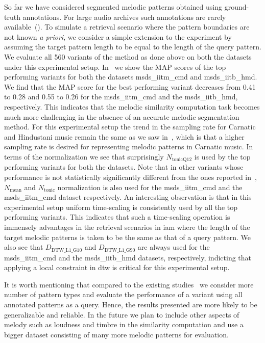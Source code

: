So far we have considered segmented melodic patterns obtained using ground-truth annotations. For large audio archives such annotations are rarely available~(). To simulate a retrieval scenario where the pattern boundaries are not known \textit{a priori}, we consider a simple extension to the experiment by assuming the target pattern length to be equal to the length of the query pattern. We evaluate all 560 variants of the method as done above on both the datasets under this experimental setup. In~ we show the MAP scores of the top performing variants for both the datasets \acrshort{msds_iitm_cmd} and \acrshort{msds_iitb_hmd}. We find that the MAP score for the best performing variant decreases from 0.41 to 0.28 and 0.55 to 0.26 for the \acrshort{msds_iitm_cmd} and the \acrshort{msds_iitb_hmd}, respectively. This indicates that the melodic similarity computation task becomes much more challenging in the absence of an accurate melodic segmentation method. For this experimental setup the trend in the sampling rate for Carnatic and Hindustani music remain the same as we saw in~, which is that a higher sampling rate is desired for representing melodic patterns in Carnatic music. In terms of the normalization we see that surprisingly $N_{\mathrm{tonicQ12}}$ is used by the top performing variants for both the datasets. Note that in other variants whose performance is not statistically significantly different from the ones reported in~, $N_{\mathrm{mean}}$ and $N_{\mathrm{tonic}}$ normalization is also used for the \acrshort{msds_iitm_cmd} and the \acrshort{msds_iitm_cmd} dataset respectively. An interesting observation is that in this experimental setup uniform time-scaling is consistently used by all the top performing variants. This indicates that such a time-scaling operation is immensely advantages in the retrieval scenarios in \gls{iam} where the length of the target melodic patterns is taken to be the same as that of a query pattern. We also see that $D_{\mathrm{DTW\_L1\_G10}}$ and $D_{\mathrm{DTW\_L1\_G90}}$ are always used for the \acrshort{msds_iitm_cmd} and the \acrshort{msds_iitb_hmd} datasets, respectively, indicting that applying a local constraint in \gls{dtw} is critical for this experimental setup.

It is worth mentioning that compared to the existing studies~\cite{Ishwar2013, Ross2012b} we consider more number of pattern types and evaluate the performance of a variant using all annotated patterns as a query. Hence, the results presented are more likely to be generalizable and reliable. In the future we plan to include other aspects of melody such as loudness and timbre in the similarity computation and use a bigger dataset consisting of many more melodic patterns for evaluation.

